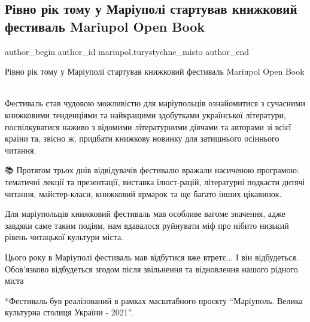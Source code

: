  
 
 
 
 

\subsection{Рівно рік тому у Маріуполі стартував книжковий фестиваль Mariupol Open Book}
\label{sec:24_09_2022.fb.mariupol.turystychne_misto.1.rik_tomu_start_mariupol_open_book}

\ifcmt
 author_begin
   author_id mariupol.turystychne_misto
 author_end
\fi

Рівно рік тому у Маріуполі стартував книжковий фестиваль Mariupol Open Book  📖

Фестиваль став чудовою можливістю для маріупольців ознайомитися з сучасними
книжковими тенденціями та найкращими здобутками української літератури,
поспілкуватися наживо з відомими літературними діячами та авторами зі всієї
країни та, звісно ж, придбати книжкову новинку для затишнього осіннього
читання.

📚 Протягом трьох днів відвідувачів фестивалю вражали насиченою програмою:
тематичні лекції та презентації, виставка ілюст\hyp{}рацій, літературні подкасти
дитячі читання, майстер-класи, книжковий ярмарок та ще багато інших цікавинок.

Для маріупольців книжковий фестиваль мав особливе вагоме значення, адже завдяки
саме таким подіям, нам вдавалося руйнувати міф про нібито низький рівень
читацької культури міста.

Цього року в Маріуполі фестиваль мав відбутися вже втретє... І він відбудеться.
Обов'язково відбудеться згодом після звільнення та відновлення нашого рідного
міста 💛

*Фестиваль був реалізований в рамках масштабного проєкту \enquote{Маріуполь.
Велика культурна столиця України - 2021}.
